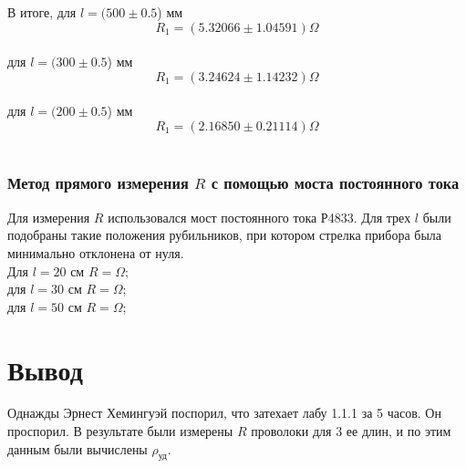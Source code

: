 \documentclass{article}
\begin{document}
	В итоге,
	для $l = (500 \pm 0.5$) мм 
	$$R_{1} = (5.32066 \pm 1.04591) \Omega$$\\
	для $l = (300 \pm 0.5$) мм 
	$$R_{1} = (3.24624 \pm 1.14232) \Omega$$ \\
	для $l = (200 \pm 0.5$) мм 
	$$R_{1} = (2.16850 \pm 0.21114) \Omega$$ \\
	
	
	
	\subsubsection{Метод прямого измерения $R$ с помощью моста постоянного тока}
	Для измерения $R$ использовался мост постоянного тока Р4833. Для трех $l$ были подобраны такие положения рубильников, при котором стрелка прибора была минимально отклонена от нуля.\\
	Для $l = 20 \text{ см}$ $R = \Omega$;\\
	для $l = 30 \text{ см}$ $R = \Omega$;\\
	для $l = 50 \text{ см}$ $R = \Omega$;\\
	
	
	\section{Вывод}
	Однажды Эрнест Хемингуэй поспорил, что затехает лабу 1.1.1 за 5 часов. Он проспорил. В результате были измерены $R$ проволоки для 3 ее длин, и по этим данным были вычислены $\rho_{\text{уд}}$.
	
\end{document}
